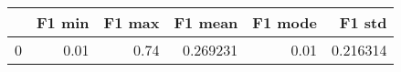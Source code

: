\begin{tabular}{lrrrrr}
\toprule
{} &  F1 min &  F1 max &   F1 mean &  F1 mode &    F1 std \\
\midrule
0 &    0.01 &    0.74 &  0.269231 &     0.01 &  0.216314 \\
\bottomrule
\end{tabular}
